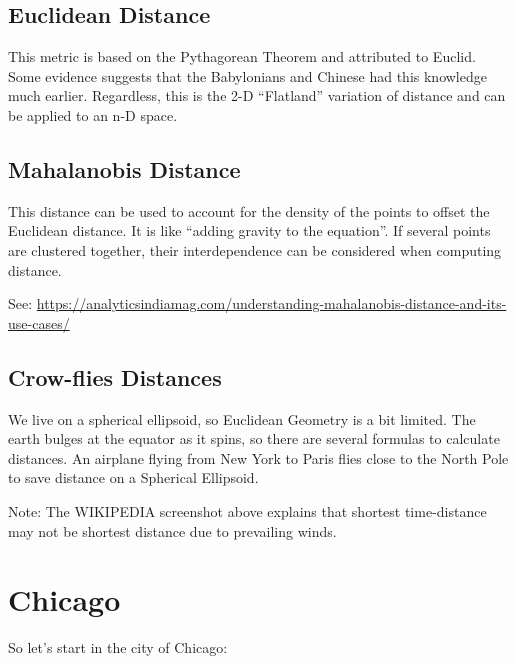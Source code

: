 \documentclass[
]{article}
\begin{document}
\hypertarget{euclidean-distance}{%
\subsection{Euclidean Distance}\label{euclidean-distance}}

This metric is based on the Pythagorean Theorem and attributed to
Euclid. Some evidence suggests that the Babylonians and Chinese had this
knowledge much earlier. Regardless, this is the 2-D ``Flatland''
variation of distance and can be applied to an n-D space.

\hypertarget{mahalanobis-distance}{%
\subsection{Mahalanobis Distance}\label{mahalanobis-distance}}

This distance can be used to account for the density of the points to
offset the Euclidean distance. It is like ``adding gravity to the
equation''. If several points are clustered together, their
interdependence can be considered when computing distance.

See:
\url{https://analyticsindiamag.com/understanding-mahalanobis-distance-and-its-use-cases/}

\hypertarget{crow-flies-distances}{%
\subsection{Crow-flies Distances}\label{crow-flies-distances}}

We live on a spherical ellipsoid, so Euclidean Geometry is a bit
limited. The earth bulges at the equator as it spins, so there are
several formulas to calculate distances. An airplane flying from New
York to Paris flies close to the North Pole to save distance on a
Spherical Ellipsoid.

Note: The WIKIPEDIA screenshot above explains that shortest
time-distance may not be shortest distance due to prevailing winds.

\hypertarget{chicago}{%
\section{Chicago}\label{chicago}}

So let's start in the city of Chicago:
\end{document}
